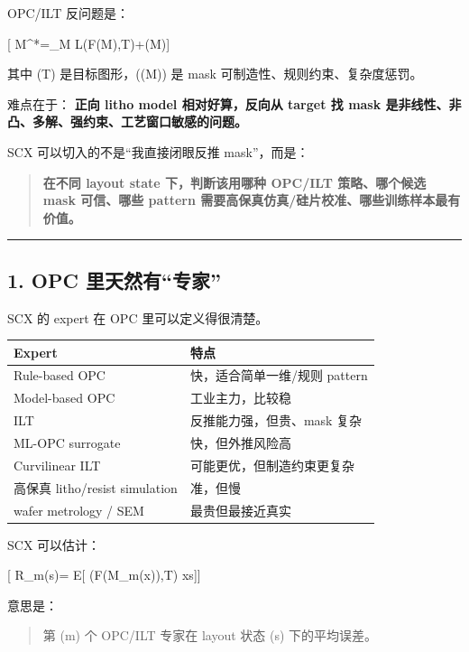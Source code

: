 \documentclass[
  12pt,
]{ctexart}
\begin{document}
OPC/ILT 反问题是：

{[} M\^{}*=\arg\min\_M \mathcal L(F(M),T)+\lambda \Omega(M){]}

其中 (T) 是目标图形，(\Omega(M)) 是 mask
可制造性、规则约束、复杂度惩罚。

难点在于： \textbf{正向 litho model 相对好算，反向从 target 找 mask
是非线性、非凸、多解、强约束、工艺窗口敏感的问题。}

SCX 可以切入的不是``我直接闭眼反推 mask''，而是：

\begin{quote}
\textbf{在不同 layout state 下，判断该用哪种 OPC/ILT 策略、哪个候选 mask
可信、哪些 pattern 需要高保真仿真/硅片校准、哪些训练样本最有价值。}
\end{quote}

\begin{center}\rule{0.5\linewidth}{0.5pt}\end{center}

\subsection{1. OPC
里天然有``专家''}\label{opc-ux91ccux5929ux7136ux6709ux4e13ux5bb6}

SCX 的 expert 在 OPC 里可以定义得很清楚。

\begin{longtable}[]{@{}ll@{}}
\toprule\noalign{}
Expert & 特点 \\
\midrule\noalign{}
\endhead
\bottomrule\noalign{}
\endlastfoot
Rule-based OPC & 快，适合简单一维/规则 pattern \\
Model-based OPC & 工业主力，比较稳 \\
ILT & 反推能力强，但贵、mask 复杂 \\
ML-OPC surrogate & 快，但外推风险高 \\
Curvilinear ILT & 可能更优，但制造约束更复杂 \\
高保真 litho/resist simulation & 准，但慢 \\
wafer metrology / SEM & 最贵但最接近真实 \\
\end{longtable}

SCX 可以估计：

{[} R\_m(s)= \mathbb E{[} \ell(F(M\_m(x)),T) \mid x\in s{]}{]}

意思是：

\begin{quote}
第 (m) 个 OPC/ILT 专家在 layout 状态 (s) 下的平均误差。
\end{quote}
\end{document}
